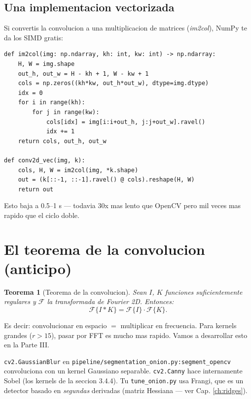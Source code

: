 \documentclass[11pt,a4paper,twoside,openright]{book}
\newtheorem{teorema}[definicion]{Teorema}
\begin{document}
\subsection{Una implementacion vectorizada}

Si convertis la convolucion a una multiplicacion de matrices (\emph{im2col}), NumPy te da los SIMD gratis:

\begin{lstlisting}[caption={Convolucion via im2col (NumPy vectorizado).}]
def im2col(img: np.ndarray, kh: int, kw: int) -> np.ndarray:
    H, W = img.shape
    out_h, out_w = H - kh + 1, W - kw + 1
    cols = np.zeros((kh*kw, out_h*out_w), dtype=img.dtype)
    idx = 0
    for i in range(kh):
        for j in range(kw):
            cols[idx] = img[i:i+out_h, j:j+out_w].ravel()
            idx += 1
    return cols, out_h, out_w

def conv2d_vec(img, k):
    cols, H, W = im2col(img, *k.shape)
    out = (k[::-1, ::-1].ravel() @ cols).reshape(H, W)
    return out
\end{lstlisting}

Esto baja a 0.5--1 s --- todavia 30x mas lento que OpenCV pero mil veces mas rapido que el ciclo doble.

\section{El teorema de la convolucion (anticipo)}

\begin{teorema}[Teorema de la convolucion]
Sean $I$, $K$ funciones suficientemente regulares y $\mathcal{F}$ la transformada de Fourier 2D. Entonces:
\begin{equation}
\mathcal{F}\{I * K\} = \mathcal{F}\{I\} \cdot \mathcal{F}\{K\}.
\label{eq:conv-theorem}
\end{equation}
\end{teorema}

Es decir: convolucionar en espacio $=$ multiplicar en frecuencia. Para kernels grandes ($r > 15$), pasar por FFT es mucho mas rapido. Vamos a desarrollar esto en la Parte III.

\begin{pipeline}
\texttt{cv2.GaussianBlur} en \texttt{pipeline/segmentation\_onion.py:segment\_opencv} convoluciona con un kernel Gaussiano separable. \texttt{cv2.Canny} hace internamente Sobel (los kernels de la seccion 3.4.4). Tu \texttt{tune\_onion.py} usa Frangi, que es un detector basado en \emph{segundas} derivadas (matriz Hessiana --- ver Cap. \ref{ch:ridges}).
\end{pipeline}
\end{document}
